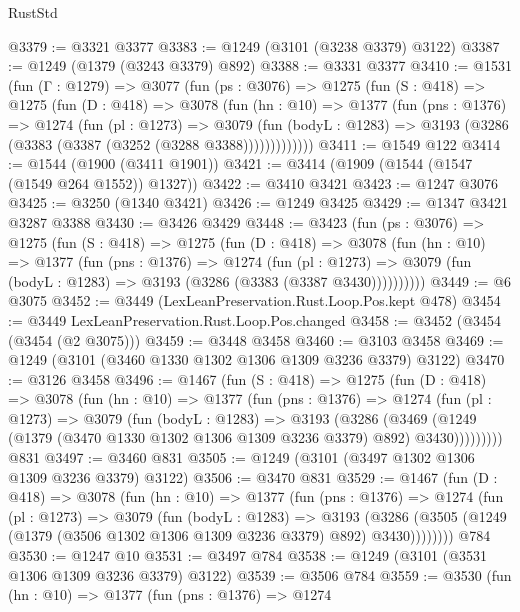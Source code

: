 \begin{lexlean}{RustStd}
\begin{coremodule}
{\begin{coremodule}
{{{{{{{{{{{@3379 := @3321 @3377
@3383 := @1249 (@3101 (@3238 @3379) @3122)
@3387 := @1249 (@1379 (@3243 @3379) @892)
@3388 := @3331 @3377
@3410 := @1531
    (fun (Γ : @1279) =>
    @3077
      (fun (ps : @3076) =>
      @1275
        (fun (S : @418) =>
        @1275
          (fun (D : @418) =>
          @3078
            (fun (hn : @10) =>
            @1377
              (fun (pns : @1376) =>
              @1274
                (fun (pl : @1273) =>
                @3079
                  (fun (bodyL : @1283) =>
                  @3193 (@3286 (@3383 (@3387 (@3252 (@3288 @3388)))))))))))))
@3411 := @1549 @122
@3414 := @1544 (@1900 (@3411 @1901))
@3421 := @3414 (@1909 (@1544 (@1547 (@1549 @264 @1552)) @1327))
@3422 := @3410 @3421
@3423 := @1247 @3076
@3425 := @3250 (@1340 @3421)
@3426 := @1249 @3425
@3429 := @1347 @3421 @3287 @3388
@3430 := @3426 @3429
@3448 := @3423
    (fun (ps : @3076) =>
    @1275
      (fun (S : @418) =>
      @1275
        (fun (D : @418) =>
        @3078
          (fun (hn : @10) =>
          @1377
            (fun (pns : @1376) =>
            @1274
              (fun (pl : @1273) =>
              @3079 (fun (bodyL : @1283) => @3193 (@3286 (@3383 (@3387 @3430))))))))))
@3449 := @6 @3075
@3452 := @3449 (LexLeanPreservation.Rust.Loop.Pos.kept @478)
@3454 := @3449 LexLeanPreservation.Rust.Loop.Pos.changed
@3458 := @3452 (@3454 (@3454 (@2 @3075)))
@3459 := @3448 @3458
@3460 := @3103 @3458
@3469 := @1249 (@3101 (@3460 @1330 @1302 @1306 @1309 @3236 @3379) @3122)
@3470 := @3126 @3458
@3496 := @1467
    (fun (S : @418) =>
    @1275
      (fun (D : @418) =>
      @3078
        (fun (hn : @10) =>
        @1377
          (fun (pns : @1376) =>
          @1274
            (fun (pl : @1273) =>
            @3079
              (fun (bodyL : @1283) =>
              @3193
                (@3286
                  (@3469
                    (@1249 (@1379 (@3470 @1330 @1302 @1306 @1309 @3236 @3379) @892) @3430)))))))))
    @831
@3497 := @3460 @831
@3505 := @1249 (@3101 (@3497 @1302 @1306 @1309 @3236 @3379) @3122)
@3506 := @3470 @831
@3529 := @1467
    (fun (D : @418) =>
    @3078
      (fun (hn : @10) =>
      @1377
        (fun (pns : @1376) =>
        @1274
          (fun (pl : @1273) =>
          @3079
            (fun (bodyL : @1283) =>
            @3193
              (@3286 (@3505 (@1249 (@1379 (@3506 @1302 @1306 @1309 @3236 @3379) @892) @3430))))))))
    @784
@3530 := @1247 @10
@3531 := @3497 @784
@3538 := @1249 (@3101 (@3531 @1306 @1309 @3236 @3379) @3122)
@3539 := @3506 @784
@3559 := @3530
    (fun (hn : @10) =>
    @1377
      (fun (pns : @1376) =>
      @1274
}}}}}}}}}}}
\end{coremodule}}
\end{coremodule}
\end{lexlean}
